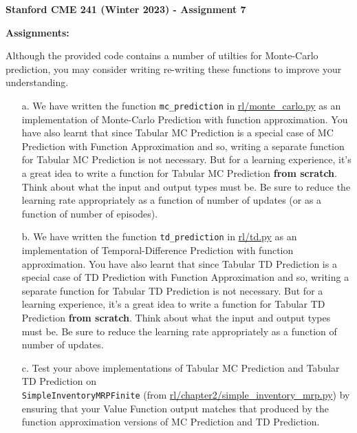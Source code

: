 \documentclass[12pt]{exam}
\begin{document}
\begin{center}
{\large {\bf Stanford CME 241 (Winter 2023) - Assignment 7}}
\end{center}
 
{\large{\bf Assignments:}}
\begin{questions}
 Although the provided code contains a number of utilties for Monte-Carlo prediction, you may consider writing re-writing these functions to improve your understanding. 
\begin{enumerate}
	\item[a.] We have written the function \lstinline{mc_prediction} in \href{https://github.com/TikhonJelvis/RL-book/blob/master/rl/monte_carlo.py}{rl\//monte\_carlo.py} as an implementation of Monte-Carlo Prediction with function approximation. You have also learnt that since Tabular MC Prediction is a special case of MC Prediction with Function Approximation and so, writing a separate function for Tabular MC Prediction is not necessary. But for a learning experience, it's a great idea to write a function for Tabular MC Prediction {\bf from scratch}. Think about what the input and output types must be. Be sure to reduce the learning rate appropriately as a function of number of updates (or as a function of number of episodes).
	\item[b.] We have written the function \lstinline{td_prediction} in \href{https://github.com/TikhonJelvis/RL-book/blob/master/rl/td.py}{rl\//td.py} as an implementation of Temporal-Difference Prediction with function approximation. You have also learnt that since Tabular TD Prediction is a special case of TD Prediction with Function Approximation and so, writing a separate function for Tabular TD Prediction is not necessary. But for a learning experience, it's a great idea to write a function for Tabular TD Prediction {\bf from scratch}. Think about what the input and output types must be. Be sure to reduce the learning rate appropriately as a function of number of updates. 
	\item[c.] Test your above implementations of Tabular MC Prediction and Tabular TD Prediction on \\\lstinline{SimpleInventoryMRPFinite} (from \href{https://github.com/TikhonJelvis/RL-book/blob/master/rl/chapter2/simple_inventory_mrp.py}{rl\//chapter2\//simple\_inventory\_mrp.py}) by ensuring that your Value Function output matches that produced by the function approximation versions of MC Prediction and TD Prediction.
\end{enumerate}


\end{questions}
\end{document}
